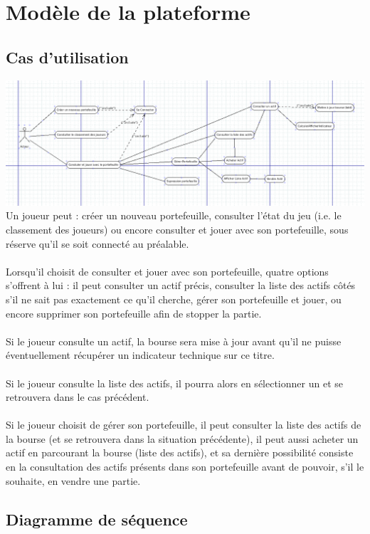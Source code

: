 \chapter{Modèle de la plateforme}

\section{Cas d'utilisation}
\includegraphics[width=\textwidth,height=\textheight,keepaspectratio]{../graph/CasDutilisationGeneral.png}
\\
Un joueur peut : créer un nouveau portefeuille, consulter l'état du jeu (i.e. le classement des joueurs) ou encore consulter et jouer avec son portefeuille, sous réserve qu'il se soit connecté au préalable. \\ \\
Lorsqu'il choisit de consulter et jouer avec son portefeuille, quatre options s'offrent à lui : il peut consulter un actif précis, consulter la liste des actifs côtés s'il ne sait pas exactement ce qu'il cherche, gérer son portefeuille et jouer, ou encore supprimer son portefeuille afin de stopper la partie. \\ \\
Si le joueur consulte un actif, la bourse sera mise à jour avant qu'il ne puisse éventuellement récupérer un indicateur technique sur ce titre.\\ \\
Si le joueur consulte la liste des actifs, il pourra alors en sélectionner un et se retrouvera dans le cas précédent. \\ \\
Si le joueur choisit de gérer son portefeuille, il peut consulter la liste des actifs de la bourse (et se retrouvera dans la situation précédente), il peut aussi acheter un actif en parcourant la bourse (liste des actifs), et sa dernière possibilité consiste en la consultation des actifs présents dans son portefeuille avant de pouvoir, s'il le souhaite, en vendre une partie.

\section{Diagramme de séquence}
